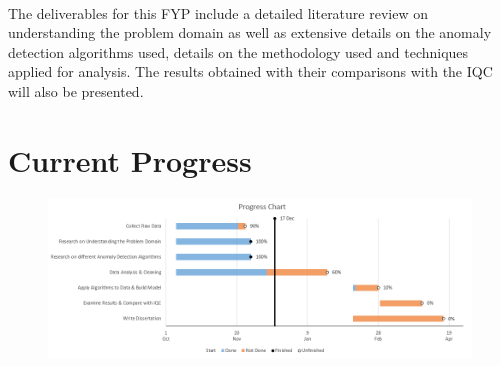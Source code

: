 \documentclass[12pt, twoside]{report}
\begin{document}
	\paragraph{ }The deliverables for this FYP include a detailed literature review on understanding the problem domain as well as extensive details on the anomaly detection algorithms used, details on the methodology used and techniques applied for analysis. The results obtained with their comparisons with the IQC will also be presented.
	
	\section{Current Progress}
	\begin{figure}[H]
		\centering
		\includegraphics[width=\linewidth]{GnattChart}
		\label{fig:GnattChart}
	\end{figure}
	
\end{document}
